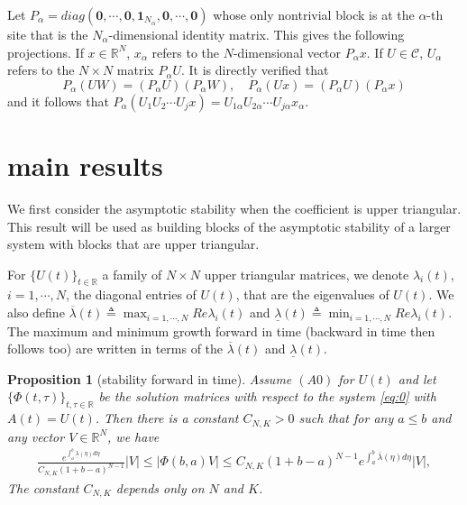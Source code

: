 \documentclass[a4paper,11pt]{article}
\newcommand{\upl}{\overline{\lambda}}
\newcommand{\udl}{\underline{\lambda}}
\newcommand{\C}{\mathcal{C}}
\newcounter{Theorem}
\newtheorem{proposition}[Theorem]{Proposition}
\theoremstyle{remark}
\begin{document}
Let $P_\alpha=diag(\mathbf{0},\cdots,\mathbf{0},\mathbf{1}_{N_\alpha},\mathbf{0},\cdots,\mathbf{0})$ whose only nontrivial block is at the $\alpha$-th site that is the $N_\alpha$-dimensional identity matrix. This gives the following projections. If $x\in \mathbb{R}^N$, $x_\alpha$ refers to the $N$-dimensional vector $P_\alpha x$. If $U\in \C$, $U_\alpha$ refers to the $N\times N$ matrix $P_\alpha U$. It is directly verified that 
$$P_\alpha (UW) = (P_\alpha U) (P_\alpha W), \quad P_\alpha (U x) = (P_\alpha U) (P_\alpha x)$$
and it follows that $P_\alpha(U_1U_2\cdots U_j x) = U_{1\alpha}U_{2\alpha}\cdots U_{j\alpha} x_\alpha.$


\section{main results}

We first consider the asymptotic stability when the coefficient is upper triangular. This result will be used as building blocks of the asymptotic stability of a larger system with blocks that are upper triangular. 

For $\{U(t)\}_{t\in \mathbb{R}}$  a family of $N\times N$ upper triangular matrices, we denote $\lambda_i(t)$, $i=1,\cdots,N$, the diagonal entries of $U(t)$, that are the eigenvalues of $U(t)$. We also define $\displaystyle\upl(t)\triangleq \max_{i=1,\cdots,N} Re \lambda_i(t)$ and $\displaystyle \udl(t)\triangleq \min_{i=1,\cdots,N} Re \lambda_i(t)$. The maximum and minimum growth forward in time (backward in time then follows too) are written in terms of the $\upl(t)$ and $\udl(t)$. 

\begin{proposition}[stability forward in time] \label{stability} Assume $(A0)$ for $U(t)$ and let $\{\Phi(t,\tau)\}_{t,\tau \in \mathbb{R}}$ be the solution matrices with respect to the system \eqref{eq:0} with $A(t)=U(t)$. Then there is a constant $C_{N,K}>0$ such that for any $a \le b$ and any vector $V \in \mathbb{R}^N$, we have
\begin{equation} \label{stabestim}
 \begin{aligned}
 \frac{e^{\int_a^b \udl(\eta) d\eta}}{C_{N,K}(1+b-a)^{N-1}}|V| \le |\Phi(b,a)V|
 \le C_{N,K}(1+b-a)^{N-1}e^{\int_a^b \upl(\eta) d\eta}|V|,  
 \end{aligned}
\end{equation}
The constant $C_{N,K}$ depends only on $N$ and $K$. 
\end{proposition}
\end{document}
